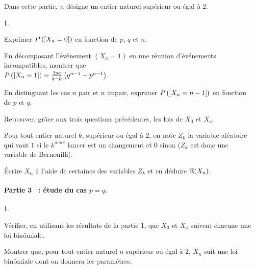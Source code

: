 \documentclass[11pt]{article}%
\begin{document}
Dans cette partie, $n$ désigne un entier naturel supérieur ou égal à 
$2$.

\begin{noliste}{1.}
 \setlength{\itemsep}{4mm}
\item Exprimer $P\left(\left[ {X_{n} = 0} \right]\right)$ en fonction de $p$, $q$
et $n$.

\item En décomposant l'événement $(X_{n} = 1)$ en une réunion
d'événements incompatibles, montrer que \\
$ P\left(\left[ {X_{n} = 1} \right]\right) = \frac{2pq}{q-p}\left(
q^{n-1}-p^{n-1}\right) $.

\item En distinguant les cas $n$ pair et $n$ impair, exprimer
$P\left(\left[ {X_{n} = n-1} \right]\right)$
en fonction de $p$ et $q$.

\item Retrouver, gr\^{a}ce aux trois questions précédentes, les lois de
$X_{3}$ et $X_{4}$.

\item Pour tout entier naturel $k$, supérieur ou égal à $2$, on note
$Z_{k}$ la variable aléatoire qui vaut $1$ si le $k^{i\grave{e}me}$
lancer
est un changement et $0$ sinon ($Z_{k}$ est donc une variable de
Bernouilli).

Écrire $X_{n}$ à l'aide de certaines des variables $Z_{k}$ et en
déduire $\mathbb{E}(X_{n})$.
\end{noliste}

\paragraph{Partie 3~ : étude du cas $p = q$.}

\begin{noliste}{1.}
 \setlength{\itemsep}{4mm}
\item Vérifier, en utilisant les résultats de la partie 1, que $X_{3}$
et $X_{4}$ suivent chacune une loi bin\^{o}miale.

\item Montrer que, pour tout entier naturel $n$ supérieur ou égal à
$2$, $X_{n}$ suit une loi bin\^{o}miale dont on donnera les paramètres.
\end{noliste}
\end{document}
